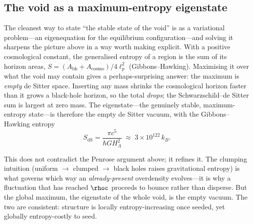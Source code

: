 \subsection{The void as a maximum-entropy eigenstate}
\label{sec:void-eigenstate}

The cleanest way to state ``the stable state of the void'' is as a variational
problem---an eigenequation for the equilibrium configuration---and solving it sharpens
the picture above in a way worth making explicit. With a positive cosmological
constant, the generalised entropy of a region is the sum of its horizon areas,
$S=(A_{\mathrm{bh}}+A_{\mathrm{cosmo}})/4\ell_p^2$ (Gibbons--Hawking). Maximising it
over what the void may contain gives a perhaps-surprising answer: the maximum is
\emph{empty} de Sitter space. Inserting any mass shrinks the cosmological horizon
faster than it grows a black-hole horizon, so the total \emph{drops}; the
Schwarzschild--de Sitter sum is largest at zero mass. The eigenstate---the genuinely
stable, maximum-entropy state---is therefore the empty de Sitter vacuum, with the
Gibbons--Hawking entropy
\begin{equation}
  S_{\mathrm{dS}} = \frac{\pi c^5}{\hbar G H_\Lambda^2}
  \;\approx\; 3\times10^{122}\,k_B .
\end{equation}

This does not contradict the Penrose argument above; it refines it. The clumping
intuition (uniform $\to$ clumped $\to$ black holes raises gravitational entropy) is
what governs which way an \emph{already-present} overdensity evolves---it is why a
fluctuation that has reached $\rhoc$ proceeds to bounce rather than disperse. But the
global maximum, the eigenstate of the whole void, is the empty vacuum. The two are
consistent: structure is locally entropy-increasing once seeded, yet globally
entropy-costly to seed.

